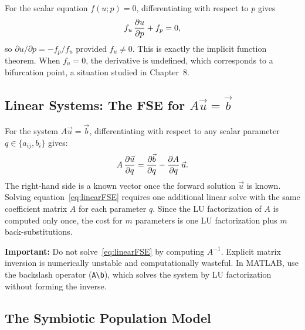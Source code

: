 For the scalar equation $f(u; p) = 0$, differentiating with
respect to $p$ gives
\[
  f_u\,\frac{\partial u}{\partial p} + f_p = 0,
\]
so $\partial u/\partial p = -f_p/f_u$ provided $f_u \neq 0$.
This is exactly the implicit function theorem.
When $f_u = 0$, the derivative is undefined, which corresponds
to a bifurcation point, a situation studied in Chapter~8.

\subsection{Linear Systems: The FSE for $A\vec{u} = \vec{b}$}

For the system $A\vec{u} = \vec{b}$, differentiating with
respect to any scalar parameter $q \in \{a_{ij}, b_i\}$ gives:
\begin{equation}
  A\,\frac{\partial \vec{u}}{\partial q} = \frac{\partial \vec{b}}{\partial q} - \frac{\partial A}{\partial q}\,\vec{u}.
  \label{eq:linearFSE}
\end{equation}
The right-hand side is a known vector once the forward solution
$\vec{u}$ is known.
Solving equation~\eqref{eq:linearFSE} requires one additional
linear solve with the same coefficient matrix $A$ for each parameter $q$.
Since the LU factorization of $A$ is computed only once, the cost
for $m$ parameters is one LU factorization plus $m$ back-substitutions.

\textbf{Important:} Do not solve~\eqref{eq:linearFSE} by computing $A^{-1}$.
Explicit matrix inversion is numerically unstable and computationally
wasteful. In MATLAB, use the backslash operator (\texttt{A\textbackslash b}),
which solves the system by LU factorization without forming the inverse.

\subsection{The Symbiotic Population Model}

